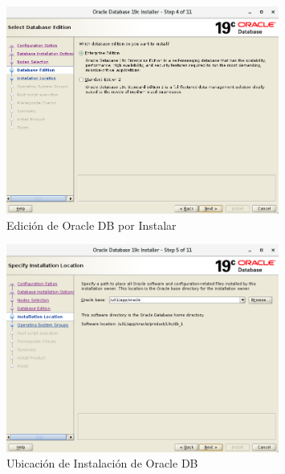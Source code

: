\documentclass{article}
\begin{document}
\begin{figure}[H]
		\begin{center}
			\includegraphics[width=0.80\textwidth]{db_install_4_database_edition.png}
		\end{center}
		\caption{Edición de Oracle DB por Instalar}
\end{figure}


\begin{figure}[H]
		\begin{center}
			\includegraphics[width=0.80\textwidth]{db_install_5_instalation_location.png}
		\end{center}
		\caption{Ubicación de Instalación de Oracle DB}
\end{figure}
\end{document}
